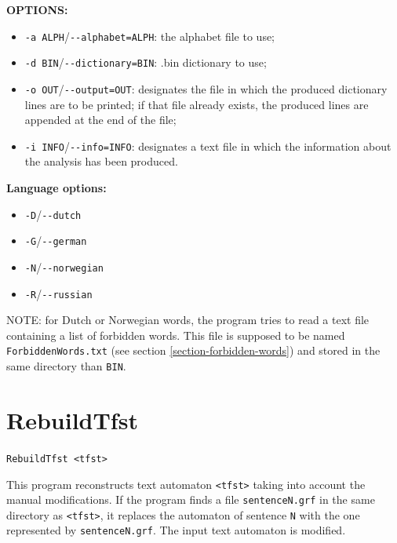 \bigskip
\noindent \textbf{OPTIONS:}
\begin{itemize}
  \item \verb+-a ALPH+/\verb+--alphabet=ALPH+: the alphabet file to use;

  \item \verb+-d BIN+/\verb+--dictionary=BIN+: .bin dictionary to use;

  \item \verb+-o OUT+/\verb+--output=OUT+: designates the file in which the 
  produced dictionary lines are to be printed; if that file already exists, 
  the produced lines are appended at the end of the file;

  \item \verb+-i INFO+/\verb+--info=INFO+: designates a text file in which 
  the information about the analysis has been produced.
\end{itemize}

\bigskip
\noindent \textbf{Language options:}
\begin{itemize}
  \item \verb+-D+/\verb+--dutch+
  \item \verb+-G+/\verb+--german+
  \item \verb+-N+/\verb+--norwegian+
  \item \verb+-R+/\verb+--russian+
\end{itemize}  

\bigskip
\noindent NOTE: for Dutch or Norwegian words, the program tries to read a text
file containing a list of forbidden words. This file is supposed to be named
\verb+ForbiddenWords.txt+ (see section \ref{section-forbidden-words}) and stored
in the same directory than \verb+BIN+.






\section{RebuildTfst}
\verb+RebuildTfst <tfst>+

\bigskip
\noindent {}This 
program reconstructs text automaton \verb+<tfst>+ taking into account the
manual modifications. If the program finds a file \verb+sentenceN.grf+ in the
same directory as \verb+<tfst>+, it replaces the automaton of sentence
\verb+N+ with the one represented by \verb+sentenceN.grf+. The input text
automaton is modified.






